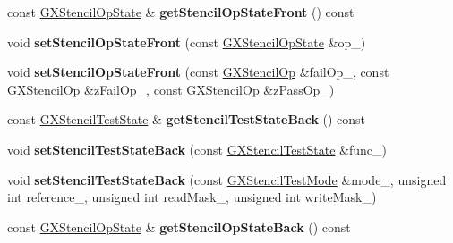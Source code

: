 \begin{DoxyCompactItemize}
\item 
const \hyperlink{class_magnum_1_1_g_x_stencil_op_state}{G\+X\+Stencil\+Op\+State} \& {\bfseries get\+Stencil\+Op\+State\+Front} () const \hypertarget{class_magnum_1_1_g_x_context_a3e14cbc5c89a4a047e07835ae35be6af}{}\label{class_magnum_1_1_g_x_context_a3e14cbc5c89a4a047e07835ae35be6af}

\item 
void {\bfseries set\+Stencil\+Op\+State\+Front} (const \hyperlink{class_magnum_1_1_g_x_stencil_op_state}{G\+X\+Stencil\+Op\+State} \&op\+\_\+)\hypertarget{class_magnum_1_1_g_x_context_a3ec31c910d91bde9accedee2412fa1e5}{}\label{class_magnum_1_1_g_x_context_a3ec31c910d91bde9accedee2412fa1e5}

\item 
void {\bfseries set\+Stencil\+Op\+State\+Front} (const \hyperlink{class_magnum_1_1_g_x_stencil_op}{G\+X\+Stencil\+Op} \&fail\+Op\+\_\+, const \hyperlink{class_magnum_1_1_g_x_stencil_op}{G\+X\+Stencil\+Op} \&z\+Fail\+Op\+\_\+, const \hyperlink{class_magnum_1_1_g_x_stencil_op}{G\+X\+Stencil\+Op} \&z\+Pass\+Op\+\_\+)\hypertarget{class_magnum_1_1_g_x_context_a7153d9974cc2b13ade9b4c84f7201e79}{}\label{class_magnum_1_1_g_x_context_a7153d9974cc2b13ade9b4c84f7201e79}

\item 
const \hyperlink{class_magnum_1_1_g_x_stencil_test_state}{G\+X\+Stencil\+Test\+State} \& {\bfseries get\+Stencil\+Test\+State\+Back} () const \hypertarget{class_magnum_1_1_g_x_context_a81833fa15e72079a336f4491ed353517}{}\label{class_magnum_1_1_g_x_context_a81833fa15e72079a336f4491ed353517}

\item 
void {\bfseries set\+Stencil\+Test\+State\+Back} (const \hyperlink{class_magnum_1_1_g_x_stencil_test_state}{G\+X\+Stencil\+Test\+State} \&func\+\_\+)\hypertarget{class_magnum_1_1_g_x_context_aa03b9a328ed02f714a6dfbd437a4b35e}{}\label{class_magnum_1_1_g_x_context_aa03b9a328ed02f714a6dfbd437a4b35e}

\item 
void {\bfseries set\+Stencil\+Test\+State\+Back} (const \hyperlink{class_magnum_1_1_g_x_stencil_test_mode}{G\+X\+Stencil\+Test\+Mode} \&mode\+\_\+, unsigned int reference\+\_\+, unsigned int read\+Mask\+\_\+, unsigned int write\+Mask\+\_\+)\hypertarget{class_magnum_1_1_g_x_context_ae9ac9b24a994ae0817d5665ef6dc9c93}{}\label{class_magnum_1_1_g_x_context_ae9ac9b24a994ae0817d5665ef6dc9c93}

\item 
const \hyperlink{class_magnum_1_1_g_x_stencil_op_state}{G\+X\+Stencil\+Op\+State} \& {\bfseries get\+Stencil\+Op\+State\+Back} () const \hypertarget{class_magnum_1_1_g_x_context_a0f8b37fac4bd27fdd67437ea033b5b2d}{}\label{class_magnum_1_1_g_x_context_a0f8b37fac4bd27fdd67437ea033b5b2d}


\end{DoxyCompactItemize}
